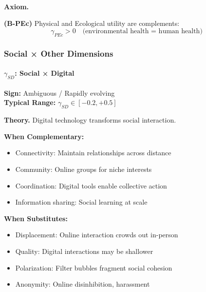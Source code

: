 \textbf{Axiom.}
\begin{axiom}
\label{ax:B-PEc}
\textbf{(B-PEc)} Physical and Ecological utility are complements:
\begin{equation}
    \gamma_{PEc} > 0 \quad \text{(environmental health = human health)}
\end{equation}
\end{axiom}


\subsubsection{Social × Other Dimensions}

\paragraph{$\gamma_{SD}$: Social × Digital}

\begin{tcolorbox}[colback=yellow!5, colframe=yellow!50!black]
\textbf{Sign:} Ambiguous / Rapidly evolving \\
\textbf{Typical Range:} $\gamma_{SD} \in [-0.2, +0.5]$
\end{tcolorbox}

\textbf{Theory.}
Digital technology transforms social interaction.

\textbf{When Complementary:}
\begin{itemize}
    \item Connectivity: Maintain relationships across distance
    \item Community: Online groups for niche interests
    \item Coordination: Digital tools enable collective action
    \item Information sharing: Social learning at scale
\end{itemize}

\textbf{When Substitutes:}
\begin{itemize}
    \item Displacement: Online interaction crowds out in-person
    \item Quality: Digital interactions may be shallower
    \item Polarization: Filter bubbles fragment social cohesion
    \item Anonymity: Online disinhibition, harassment
\end{itemize}

